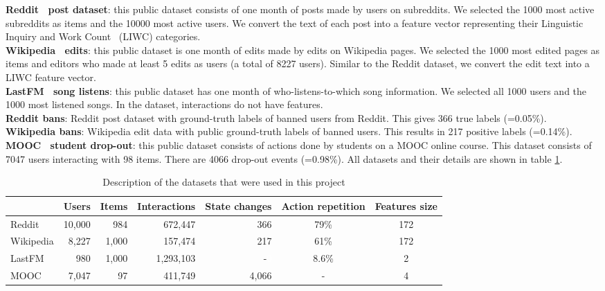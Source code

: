 \textbf{Reddit~\cite{Reddit} post dataset}: this public dataset consists of one month of posts made by users on subreddits. We selected the 1000 most active subreddits as items and the 10000 most active users. We convert the text of each post into a feature vector representing their Linguistic Inquiry and Work Count~\cite{pennebaker01LIWC} (LIWC) categories.\\
\textbf{Wikipedia~\cite{Wiki} edits}: this public dataset is one month of edits made by edits on Wikipedia pages. We selected the 1000 most edited pages as items and editors who made at least 5 edits as users (a total of 8227 users). Similar to the Reddit dataset, we convert the edit text into a LIWC feature vector.\\
\textbf{LastFM~\cite{10.1007/978-3-642-33486-3_5lastFM} song listens}: this public dataset has one month of who-listens-to-which song information. We selected all 1000 users and the 1000 most listened songs. In the dataset, interactions do not have features.\\
\textbf{Reddit bans}: Reddit post dataset with ground-truth labels of banned users from Reddit. This gives 366 true labels (=0.05\%).\\
\textbf{Wikipedia bans}: Wikipedia edit data with public ground-truth labels of banned users. This results in 217 positive labels (=0.14\%).\\
\textbf{MOOC~\cite{mooc} student drop-out}: this public dataset consists of actions done by students on a MOOC online course. This dataset consists of 7047 users interacting with 98 items. There are 4066 drop-out events (=0.98\%). All datasets and their details are shown in table \ref{description data}. \\

\setlength\tabcolsep{0.12cm} %
\begin{table}[H]
    \centering
    \begin{tabular}{@{}lrrrrcc@{}}
    \toprule
    & Users & Items & Interactions & State changes & Action repetition & Features size \\
    \midrule
    Reddit & 10,000 & 984 & 672,447 & 366 & 79\% & 172 \\
    Wikipedia & 8,227 & 1,000 & 157,474 & 217 & 61\% & 172 \\
    LastFM & 980 & 1,000 & 1,293,103 & -\textcolor{white}{0} & 8.6\% & 2 \\
    MOOC & 7,047 & 97 & 411,749 & 4,066 & - & 4 \\
    \bottomrule
    \end{tabular}
    \caption{Description of the datasets that were used in this project}
    \label{description data}
\end{table}
\setlength\tabcolsep{6pt} %

